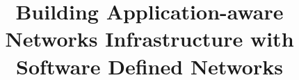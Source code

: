 \documentclass[onecolumn,draftclsnofoot]{hotsdn}
\begin{document}
%
\title{Building Application-aware Networks Infrastructure with Software Defined Networks}



\author{ }



\maketitle


\begin{abstract}

\end{abstract}












\end{document}
